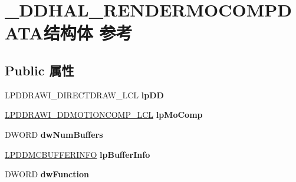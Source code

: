\hypertarget{struct___d_d_h_a_l___r_e_n_d_e_r_m_o_c_o_m_p_d_a_t_a}{}\section{\+\_\+\+D\+D\+H\+A\+L\+\_\+\+R\+E\+N\+D\+E\+R\+M\+O\+C\+O\+M\+P\+D\+A\+T\+A结构体 参考}
\label{struct___d_d_h_a_l___r_e_n_d_e_r_m_o_c_o_m_p_d_a_t_a}
\subsection*{Public 属性}
\begin{DoxyCompactItemize}
\item 
\mbox{\label{struct___d_d_h_a_l___r_e_n_d_e_r_m_o_c_o_m_p_d_a_t_a_a409c0295def5229afcc95ef0b01b5b1d}} 
L\+P\+D\+D\+R\+A\+W\+I\+\_\+\+D\+I\+R\+E\+C\+T\+D\+R\+A\+W\+\_\+\+L\+CL {\bfseries lp\+DD}
\item 
\mbox{\label{struct___d_d_h_a_l___r_e_n_d_e_r_m_o_c_o_m_p_d_a_t_a_a1fbf2c037f53e59abb2202095517a1a6}} 
\hyperlink{struct___d_d_r_a_w_i___d_d_m_o_t_i_o_n_c_o_m_p___l_c_l}{L\+P\+D\+D\+R\+A\+W\+I\+\_\+\+D\+D\+M\+O\+T\+I\+O\+N\+C\+O\+M\+P\+\_\+\+L\+CL} {\bfseries lp\+Mo\+Comp}
\item 
\mbox{\label{struct___d_d_h_a_l___r_e_n_d_e_r_m_o_c_o_m_p_d_a_t_a_a39c9b9151877b86d8af167159df7be01}} 
D\+W\+O\+RD {\bfseries dw\+Num\+Buffers}
\item 
\mbox{\label{struct___d_d_h_a_l___r_e_n_d_e_r_m_o_c_o_m_p_d_a_t_a_aa97c83f18f82be7ae8b1f621a43d05dd}} 
\hyperlink{struct___d_d_m_c_b_u_f_f_e_r_i_n_f_o}{L\+P\+D\+D\+M\+C\+B\+U\+F\+F\+E\+R\+I\+N\+FO} {\bfseries lp\+Buffer\+Info}
\item 
\mbox{\label{struct___d_d_h_a_l___r_e_n_d_e_r_m_o_c_o_m_p_d_a_t_a_ad210f0afe51166cdf45b80f6a28ca101}} 
D\+W\+O\+RD {\bfseries dw\+Function}
\item 
\mbox{\label{struct___d_d_h_a_l___r_e_n_d_e_r_m_o_c_o_m_p_d_a_t_a_a1d2bf41092b5712bf51c37ec7cb8915d}} 

\end{DoxyCompactItemize}
